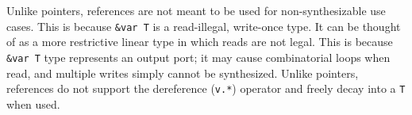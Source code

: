 \documentclass[10pt]{article}
\begin{document}
Unlike pointers, references are not meant to be used for non-synthesizable use cases. This is
because \verb|&var T| is a read-illegal, write-once type. It can be thought of as a more restrictive
linear type in which reads are not legal. This is because \verb|&var T| type represents an output
port; it may cause combinatorial loops when read, and multiple writes simply cannot be synthesized.
Unlike pointers, references do not support the dereference (\verb|v.*|) operator and freely decay
into a \verb|T| when used.
\end{document}
